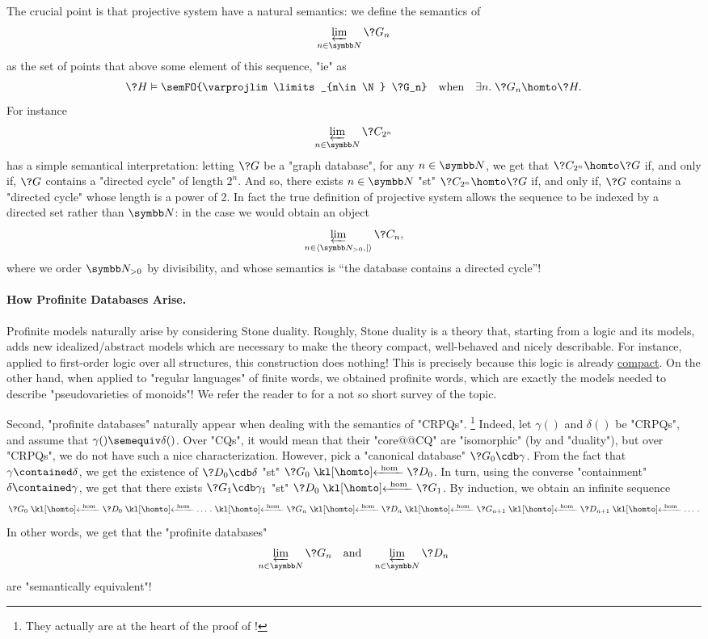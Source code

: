 The crucial point is that projective system have a natural semantics:
we define the semantics of \[\varprojlim\limits_{n\in\N} \?G_n\]
as the set of points that above some element of this sequence,
"ie" as
\[
	\?H \vDash \semFO{\varprojlim\limits_{n\in\N} \?G_n}
	\quad\text{when}\quad
	\exists n.\; \?G_n \homto \?H.
\]
For instance
\[\varprojlim\limits_{n\in\N} \?C_{2^n}\] has a simple
semantical interpretation:
letting $\?G$ be a "graph database", for any $n\in\N$, we get that $\?C_{2^n} \homto \?G$
if, and only if, $\?G$ contains a "directed cycle" of length $2^n$.
And so, there exists $n\in\N$ "st" $\?C_{2^n} \homto \?G$ if, and only if, $\?G$ contains
a "directed cycle" whose length is a power of 2.
In fact the true definition of projective system allows the sequence to
be indexed by a directed set rather than $\N$: in the case we would obtain
an object \[\varprojlim\limits_{n\in\tup{\Np,\mid}} \?C_{n},\] where we order $\Np$ by divisibility,
and whose semantics is ``the database contains a directed cycle''!

\paragraph{How Profinite Databases Arise.}
Profinite models naturally arise
by considering Stone duality. Roughly, Stone duality is a theory that,
starting from a logic and its models, adds new idealized/abstract models which
are necessary to make the theory compact, well-behaved and nicely describable.
For instance, applied to first-order logic over all structures,
this construction does nothing! This is precisely because this logic is already
\href{https://en.wikipedia.org/wiki/Compactness\_theorem}{compact}.
On the other hand, when applied to "regular languages" of finite words,
we obtained profinite words, which are exactly the models needed to describe
"pseudovarieties of monoids"! We refer the reader to \cite{GehrkeGool2024Topological}
for a not so short survey of the topic.

Second, "profinite databases" naturally appear when dealing with the semantics
of "CRPQs".%
\footnote{They actually are at the heart of
the proof of !}
Indeed, let $\gamma()$ and $\delta()$ be "CRPQs",
and assume that $\gamma() \semequiv \delta()$. Over "CQs", it would mean that
their "core@@CQ" are "isomorphic" (by  and "duality"),
but over "CRPQs", we do not have such a nice characterization.
However, pick a "canonical database" $\?G_0 \cdb \gamma$. From the
fact that $\gamma \contained \delta$, we get the existence of $\?D_0 \cdb \delta$
"st" $\?G_0 \cohomto \?D_0$. In turn, using the converse "containment" $\delta \contained \gamma$,
we get that there exists $\?G_1 \cdb \gamma_1$ "st" $\?D_0 \cohomto \?G_1$. By induction,
we obtain an infinite sequence
\[
	\?G_0 \cohomto \?D_0 \cohomto \dotsc. \cohomto \?G_n \cohomto \?D_n \cohomto
	\?G_{n+1} \cohomto \?D_{n+1} \cohomto \dotsc.
\]
In other words, we get that the "profinite databases"
\[\varprojlim_{n\in\N} \?G_{n}
\quad\text{and}\quad
\varprojlim_{n\in\N} \?D_{n}\]
are "semantically equivalent"!


